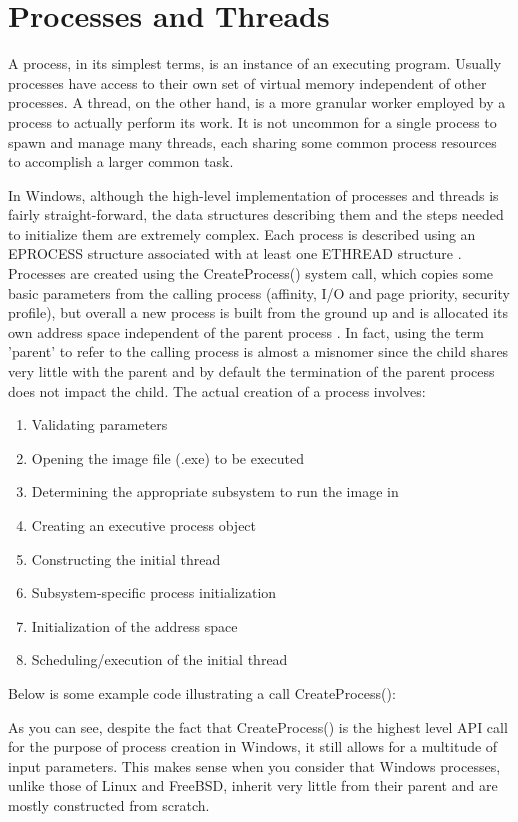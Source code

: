 \documentclass[onecolumn, draftclsnofoot,10pt, compsoc]{IEEEtran}
\begin{document}
\section{Processes and Threads}
A process, in its simplest terms, is an instance of an executing program. Usually processes have access to their own set of virtual memory independent of other processes. A thread, on the other hand, is a more granular worker employed by a process to actually perform its work. It is not uncommon for a single process to spawn and manage many threads, each sharing some common process resources to accomplish a larger common task.

In Windows, although the high-level implementation of processes and threads is fairly straight-forward, the data structures describing them and the steps needed to initialize them are extremely complex. Each process is described using an EPROCESS structure associated with at least one ETHREAD structure \cite{WindowsInternals}. Processes are created using the CreateProcess() system call, which copies some basic parameters from the calling process (affinity, I/O and page priority, security profile), but overall a new process is built from the ground up and is allocated its own address space independent of the parent process \cite{WindowsInternals}. In fact, using the term 'parent' to refer to the calling process is almost a misnomer since the child shares very little with the parent and by default the termination of the parent process does not impact the child. The actual creation of a process involves:
\begin{enumerate}
\item Validating parameters 
\item Opening the image file (.exe) to be executed
\item Determining the appropriate subsystem to run the image in 
\item Creating an executive process object
\item Constructing the initial thread
\item Subsystem-specific process initialization
\item Initialization of the address space
\item Scheduling/execution of the initial thread
\end{enumerate}

Below is some example code illustrating a call CreateProcess():

As you can see, despite the fact that CreateProcess() is the highest level API call for the purpose of process creation in Windows, it still allows for a multitude of input parameters. This makes sense when you consider that Windows processes, unlike those of Linux and FreeBSD, inherit very little from their parent and are mostly constructed from scratch.
\end{document}
